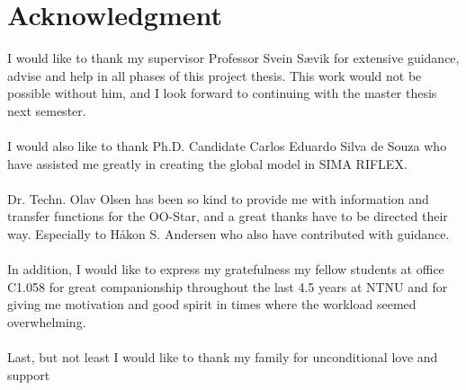 \chapter*{Acknowledgment}
I would like to thank my supervisor Professor Svein Sævik for extensive guidance, advise and help in all phases of this project thesis. This work would not be possible without him, and I look forward to continuing with the master thesis next semester. \\\\I would also like to thank Ph.D. Candidate Carlos Eduardo Silva de Souza who have assisted me greatly in creating the global model in SIMA RIFLEX. \\\\  Dr. Techn. Olav Olsen has been so kind to provide me with information and transfer functions for the OO-Star, and a great thanks have to be directed their way. Especially to Håkon S. Andersen who also have contributed with guidance. \\\\ In addition, I would like to express my gratefulness my fellow students at office C1.058 for great companionship throughout the last 4.5 years at NTNU and for giving me motivation and good spirit in times where the workload seemed overwhelming. \\\\ Last, but not least I would like to thank my family for unconditional love and support